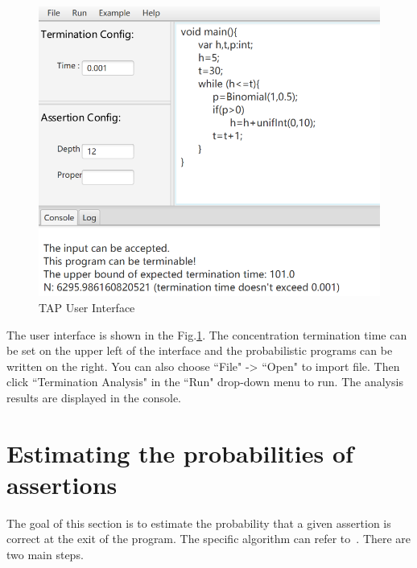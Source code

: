 \documentclass[sigconf,review, anonymous]{acmart}
\begin{document}
\begin{figure}[h]
	\centering
	\includegraphics[scale=0.6]{img/interface}
	\caption{TAP User Interface}
	\label{interface}
\end{figure}

The user interface is shown in the Fig.\ref{interface}. The concentration termination time can be set on the upper left of the interface and the probabilistic programs can be written on the right. You can also choose ``File" -> ``Open" to import file. Then click ``Termination Analysis" in the ``Run" drop-down menu to run. The analysis results are displayed in the console. 


\section{Estimating the probabilities of assertions}
The goal of this section is to estimate the probability that a given assertion is correct at the exit of the program. The specific algorithm can refer to~\cite{Sankaranarayanan2013Static}. There are two main steps.
\end{document}
